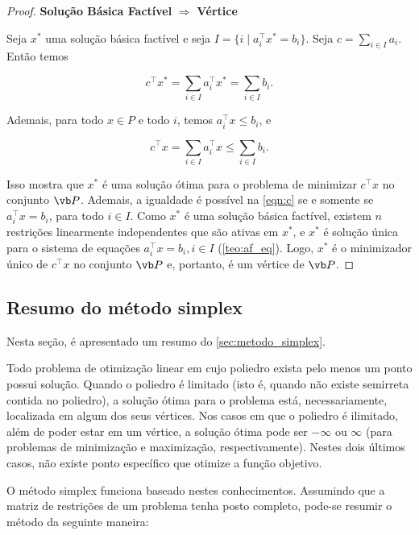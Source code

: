 \begin{proof}
\textbf{Solução Básica Factível} $\Rightarrow$ \textbf{Vértice}

Seja $x^*$ uma solução básica factível e seja $I = \{i\mid a_i^\intercal x^*=b_i\}$. Seja $c = \sum_{i\in I}a_i$. Então temos

\begin{equation}c^\intercal x^* = \sum_{i\in I}a_i^\intercal x^*=\sum_{i\in I}b_i.
\end{equation}

Ademais, para todo $x\in P$ e todo $i$, temos $a_i^\intercal x\leq b_i$, e

\begin{equation}
c^\intercal x = \sum_{i\in I}a_i^\intercal x\leq \sum_{i\in I} b_i.\label{eqn:c}
\end{equation}

Isso mostra que $x^*$ é uma solução ótima para o problema de minimizar $c^\intercal x$ no conjunto $\vb P$. Ademais, a igualdade é possível na \cref{eqn:c} se e somente se $a_i^\intercal x = b_i$, para todo $i \in I$. Como $x^*$ é uma solução básica factível, existem $n$ restrições linearmente independentes que são ativas em $x^*$, e $x^*$ é solução única para o sistema de equações $a_i^\intercal x = b_i, i \in I$ (\cref{teo:af_eq}). Logo, $x^*$ é o minimizador único de $c^\intercal x$ no conjunto $\vb P$ e, portanto, é um vértice de $\vb P$.
\end{proof}

\subsection{Resumo do método simplex}
Nesta seção, é apresentado um resumo do \cref{sec:metodo_simplex}.

Todo problema de otimização linear em cujo poliedro exista pelo menos um ponto possui solução. Quando o poliedro é limitado (isto é, quando não existe semirreta contida no poliedro), a solução ótima para o problema está, necessariamente, localizada em algum dos seus vértices. Nos casos em que o poliedro é ilimitado, além de poder estar em um vértice, a solução ótima pode ser $-\infty$ ou $\infty$ (para problemas de minimização e maximização, respectivamente). Nestes dois últimos casos, não existe ponto específico que otimize a função objetivo.

O método simplex funciona baseado nestes conhecimentos. Assumindo que a matriz de restrições de um problema tenha posto completo, pode-se resumir o método da seguinte maneira:

